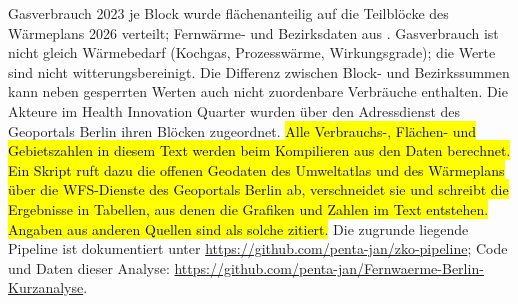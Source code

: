 \documentclass[11pt,DIV=13,a4paper,parskip=half,abstract=true,ngerman]{scrartcl}
\begin{document}

{\small
Gasverbrauch 2023 je Block \parencite{geoportal2026gas} wurde flächenanteilig auf die Teilblöcke des Wärmeplans 2026 \parencite{geoportal2026wp} verteilt; Fernwärme- und Bezirksdaten aus \textcite{geoportal2026fw}. 
Gasverbrauch ist nicht gleich Wärmebedarf (Kochgas, Prozesswärme, Wirkungsgrade); die Werte sind nicht witterungsbereinigt. 
Die Differenz zwischen Block- und Bezirkssummen kann neben gesperrten Werten auch nicht zuordenbare Verbräuche enthalten. 
Die Akteure im Health Innovation Quarter wurden über den Adressdienst des Geoportals Berlin ihren Blöcken zugeordnet. 
\hl{Alle Verbrauchs-, Flächen- und Gebietszahlen in diesem Text werden beim Kompilieren aus den Daten berechnet.}
\hl{Ein Skript ruft dazu die offenen Geodaten des Umweltatlas und des Wärmeplans über die WFS-Dienste des Geoportals Berlin ab, verschneidet sie und schreibt die Ergebnisse in Tabellen, aus denen die Grafiken und Zahlen im Text entstehen.}
\hl{Angaben aus anderen Quellen sind als solche zitiert.}
Die zugrunde liegende Pipeline ist dokumentiert unter \url{https://github.com/penta-jan/zko-pipeline};
Code und Daten dieser Analyse: \url{https://github.com/penta-jan/Fernwaerme-Berlin-Kurzanalyse}.\par
}

\printbibliography[heading=bibintoc,title={Quellen}]
\end{document}
